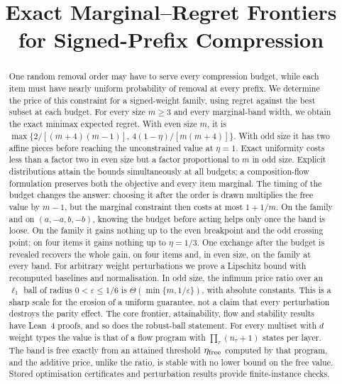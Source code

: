 



\title{Exact Marginal--Regret Frontiers\\for Signed-Prefix Compression}

\author{
}

\maketitle

\begin{abstract}
One random removal order may have to serve every compression budget, while each item must
have nearly uniform probability of removal at every prefix. We determine the price of this
constraint for a signed-weight family, using regret against the best subset at each budget.
For every size $m\ge3$ and every marginal-band width, we obtain the exact minimax expected regret.
With even size $m$, it is
$\max\{2/[(m+4)(m-1)],\,4(1-\eta)/[m(m+4)]\}$.
With odd size it has two affine pieces before reaching the unconstrained value at $\eta=1$.
Exact uniformity costs less than a factor two in even size but a factor proportional to $m$
in odd size. Explicit distributions attain the bounds simultaneously at all budgets; a
composition-flow formulation preserves both the objective and every item marginal.
The timing of the budget changes the answer: choosing it after the order is drawn
multiplies the free value by $m-1$, but the marginal constraint then costs at most $1+1/m$.
On the family and on $(a,-a,b,-b)$, knowing the budget before acting helps only once the band
is loose. On the family it gains
nothing up to the even breakpoint and the odd crossing point; on four items it gains nothing up
to $\eta=1/3$. One exchange after the budget is revealed recovers the whole gain, on four items
and, in even size, on the family at every band.
For arbitrary weight perturbations we prove a Lipschitz bound with recomputed baselines and
normalisation. In odd size, the infimum price ratio over an $\ell_1$ ball of radius
$0<\varepsilon\le1/6$ is $\Theta(\min\{m,1/\varepsilon\})$, with absolute constants.
This is a sharp scale for the erosion of a uniform guarantee, not a claim that every
perturbation destroys the parity effect. The core frontier, attainability, flow and stability
results have Lean~4 proofs, and so does the robust-ball statement.
For every multiset with $d$ weight types the value is that of a flow program with
$\prod_\tau(n_\tau+1)$ states per layer. The band is free exactly from an attained threshold
$\eta_{\rm free}$ computed by that program, and the additive price, unlike the ratio, is stable
with no lower bound on the free value.
Stored optimisation certificates and perturbation results provide finite-instance checks.
\end{abstract}

